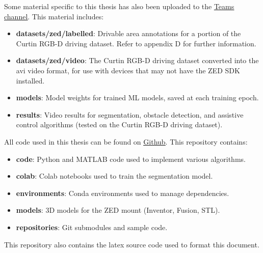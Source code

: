 Some material specific to this thesis has also been uploaded to the \href{https://curtin.sharepoint.com/:f:/r/sites/CurtinXGlide/Shared%20Documents/Navigation%20and%20Object%20Detection/JakobWyatt_19477143?csf=1&web=1&e=3noAtL}{\underline{Teams channel}}.
This material includes:
\begin{itemize}
    \item \textbf{datasets/zed/labelled}: Drivable area annotations for a portion of the Curtin RGB-D driving dataset. Refer to appendix D for further information.
    \item \textbf{datasets/zed/video}: The Curtin RGB-D driving dataset converted into the avi video format, for use with devices that may not have the ZED SDK installed.
    \item \textbf{models}: Model weights for trained ML models, saved at each training epoch.
    \item \textbf{results}: Video results for segmentation, obstacle detection, and assistive control algorithms (tested on the Curtin RGB-D driving dataset).
\end{itemize}

All code used in this thesis can be found on \href{https://github.com/JakobWyatt/smart-wheelchair}{\underline{Github}}.
This repository contains:
\begin{itemize}
    \item \textbf{code}: Python and MATLAB code used to implement various algorithms.
    \item \textbf{colab}: Colab notebooks used to train the segmentation model.
    \item \textbf{environments}: Conda environments used to manage dependencies.
    \item \textbf{models}: 3D models for the ZED mount (Inventor, Fusion, STL).
    \item \textbf{repositories}: Git submodules and sample code.
\end{itemize}
This repository also contains the latex source code used to format this document.
